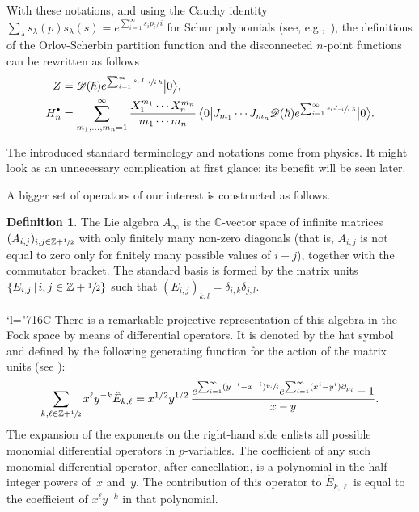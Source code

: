 \documentclass[JEP,XML,SOM,Unicode,NoEqCountersInSection,NoFloatCountersInSection]{cedram}
\let\mathcal\mathscr
\newcommand{\sbullet}{{\scriptscriptstyle\bullet}}
\newcommand{\csbullet}{{\raisebox{1pt}{$\sbullet$}}}
\newcommand{\Changelback}{\mathcode`l="716C}
\newcommand{\C}{\mathbb{C}}
\theoremstyle{plain}
\theoremstyle{definition}
\newtheorem{definition}[theorem]{Definition}
\theoremstyle{remark}
\newcommand{\Z}{\mathbb{Z}}
\newcommand{\VEV}[1]{{\bigl\langle 0 \big| {#1} \big| 0 \bigr\rangle}}
\newcommand{\Hd}{H^\csbullet}
\begin{document}
With these notations, and using the Cauchy identity $\sum_\lambda s_\lambda(p)s_\lambda(s)=e^{\sum_{i=1}^\infty s_ip_i/i}$ for Schur polynomials (see, e.g.,~\cite[p.\,386]{Stanley}), the definitions of the Orlov-Scherbin partition function and the disconnected $n$-point functions can be rewritten as follows
\begin{align}
Z&=\mathcal{D}(\hbar)e^{\sum_{i=1}^\infty \sfrac{s_iJ_{-i}}{i\,\hbar}}\big|0\big\rangle,\notag\\
\Hd_n&=\sum_{m_1,\dots,m_n=1}^\infty \frac{X_1^{m_1}\cdots X_n^{m_n}}{m_1\cdots m_n}\,
\VEV{J_{m_1}\cdots J_{m_n}\mathcal{D}(\hbar)e^{\sum_{i=1}^\infty \sfrac{s_iJ_{-i}}{i\,\hbar}}}.\label{eq:Hd}
\end{align}

The introduced standard terminology and notations come from physics. It might look as an unnecessary complication at first glance; its benefit will be seen later.

A bigger set of operators of our interest is constructed as follows.

\begin{definition}
The Lie algebra $A_\infty$ is the $\C$-vector space of infinite matrices $(A_{i,j})_{i,j\in \Z+\sfrac{1}{2}}$ with
only finitely many non-zero diagonals (that is, $A_{i,j}$ is not equal to zero only for finitely
many possible values of $i-j$), together with the commutator bracket. The standard basis is formed by the matrix units $\{E_{i,j}\,|\, i,j \in \Z+\sfrac{1}{2}\}$ such that $(E_{i,j})_{k,l} = \delta_{i,k}\delta_{j,l}$.
\end{definition}

\Changelback
There is a remarkable projective representation of this algebra in the Fock space by means of differential operators. It is denoted by the hat symbol and defined by the following generating function for the action of the matrix units (see \eg \cite[\S 6.2]{MiwaJimboDate}):
\begin{equation}\label{eq:A-action}
\sum_{k,\ell\in\Z+\sfrac{1}{2}}x^{\ell} y^{-k} \hat E_{k,\ell}=
x^{1/2}y^{1/2}\,\frac{
e^{\sum_{i=1}^\infty (y^{-i}-x^{-i}) \sfrac{p_i}{i} }
e^{\sum_{i=1}^\infty (x^i-y^i)\partial_{p_i}}-1}
{x-y}.
\end{equation}
The expansion of the exponents on the right-hand side enlists all possible monomial differential operators in $p$-variables. The coefficient of any such monomial differential operator, after cancellation, is a polynomial in the half-integer powers of~$x$ and~$y$. The contribution of this operator to $\hat E_{k,\ell}$ is equal to the coefficient of
$x^{\ell} y^{-k}$ in that polynomial.
\end{document}
